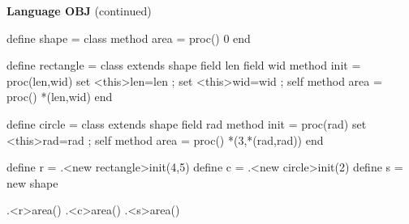 \begin{minipage}[t]{\sw}
\slidenumber
\LARGE
{\bf Language OBJ} (continued)
\large
\begin{qv}
define shape =
  class
    method area = proc() 0 %
  end

define rectangle =
  class extends shape
    field len %
    field wid %
    method init = proc(len,wid) {set <this>len=len ; set <this>wid=wid ; self}
    method area = proc() *(len,wid)
  end

define circle =
  class extends shape
    field rad %
    method init = proc(rad) {set <this>rad=rad ; self}
    method area = proc() *(3,*(rad,rad)) %
  end

define r = .<new rectangle>init(4,5) %
define c = .<new circle>init(2)      %
define s = new shape

.<r>area() %
.<c>area() %
.<s>area() %
\end{qv}
\end{minipage}
